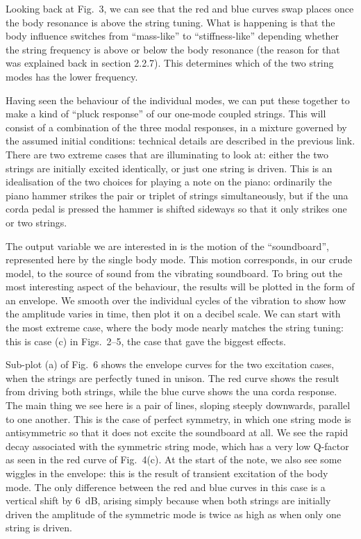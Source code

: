   Looking back at Fig.\ 3, we can see that the red and blue curves swap places 
  once the body resonance is above the string tuning. What is happening is that 
  the body influence switches from ``mass-like'' to ``stiffness-like'' 
  depending whether the string frequency is above or below the body resonance 
  (the reason for that was explained back in section 2.2.7). This determines 
  which of the two string modes has the lower frequency. 

  Having seen the behaviour of the individual modes, we can put these together 
  to make a kind of “pluck response” of our one-mode coupled strings. This will 
  consist of a combination of the three modal responses, in a mixture governed 
  by the assumed initial conditions: technical details are described in the 
  previous link. There are two extreme cases that are illuminating to look at: 
  either the two strings are initially excited identically, or just one string 
  is driven. This is an idealisation of the two choices for playing a note on 
  the piano: ordinarily the piano hammer strikes the pair or triplet of strings 
  simultaneously, but if the una corda pedal is pressed the hammer is shifted 
  sideways so that it only strikes one or two strings. 

  The output variable we are interested in is the motion of the “soundboard”, 
  represented here by the single body mode. This motion corresponds, in our 
  crude model, to the source of sound from the vibrating soundboard. To bring 
  out the most interesting aspect of the behaviour, the results will be plotted 
  in the form of an envelope. We smooth over the individual cycles of the 
  vibration to show how the amplitude varies in time, then plot it on a decibel 
  scale. We can start with the most extreme case, where the body mode nearly 
  matches the string tuning: this is case (c) in Figs.\ 2--5, the case that 
  gave the biggest effects. 

  Sub-plot (a) of Fig.\ 6 shows the envelope curves for the two excitation 
  cases, when the strings are perfectly tuned in unison. The red curve shows 
  the result from driving both strings, while the blue curve shows the una 
  corda response. The main thing we see here is a pair of lines, sloping 
  steeply downwards, parallel to one another. This is the case of perfect 
  symmetry, in which one string mode is antisymmetric so that it does not 
  excite the soundboard at all. We see the rapid decay associated with the 
  symmetric string mode, which has a very low Q-factor as seen in the red curve 
  of Fig.\ 4(c). At the start of the note, we also see some wiggles in the 
  envelope: this is the result of transient excitation of the body mode. The 
  only difference between the red and blue curves in this case is a vertical 
  shift by 6~dB, arising simply because when both strings are initially driven 
  the amplitude of the symmetric mode is twice as high as when only one string 
  is driven. 

